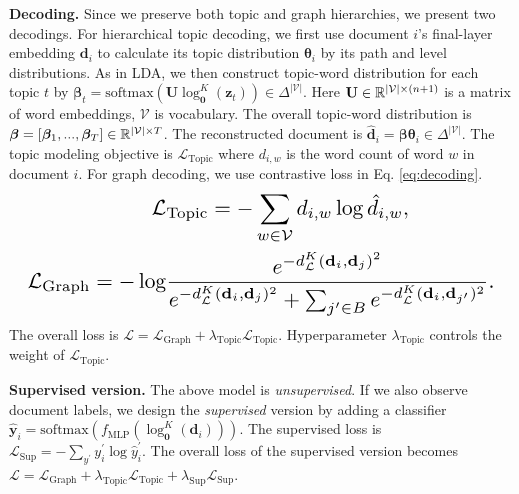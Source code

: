 \textbf{Decoding.} Since we preserve both topic and graph hierarchies, we present two decodings. For hierarchical topic decoding, we first use document $ i $'s final-layer embedding $ \textbf{d}_i $ to calculate its topic distribution $ \bm{\theta}_i $ by its path and level distributions. As in LDA, we then construct topic-word distribution for each topic $ t $ by %
$ \bm{\beta}_t=\text{softmax}(\textbf{U}\log_{\textbf{0}}^K(\textbf{z}_t))\in\Delta^{|\mathcal{V}|} $. Here $ \textbf{U}\in\Bbb R^{|\mathcal{V}|\times(n+1)} $ is a matrix of word embeddings, $ \mathcal{V} $ is vocabulary. %
The overall topic-word distribution is $ \bm{\beta}=[\bm{\beta}_1,...,\bm{\beta}_T]\in\Bbb R^{|\mathcal{V}|\times T} $. The reconstructed document is $ \hat{\textbf{d}}_i=\bm{\beta}\bm{\theta}_i\in\Delta^{|\mathcal{V}|} $. The topic modeling objective is $ \mathcal{L}_{\text{Topic}} $ where $ d_{i,w} $ is the word count of word $ w $ in document $ i $. For graph decoding, we use contrastive loss in Eq. \ref{eq:decoding}. %
\begin{equation}
\label{eq:decoding}
\resizebox{1\columnwidth}{!}{
$ \begin{split}
    \mathcal{L}&_{\text{Topic}}=-\sum_{w\in\mathcal{V}}d_{i,w}\log \hat{d}_{i,w},\\
    \mathcal{L}_{\text{Graph}}=-\log& \dfrac{e^{-d_{\mathcal{L}}^K(\textbf{d}_i,\textbf{d}_j)^2}}{e^{-d_{\mathcal{L}}^K(\textbf{d}_i,\textbf{d}_j)^2}+\sum_{j^\prime\in B}e^{-d_{\mathcal{L}}^K(\textbf{d}_i,\textbf{d}_{j^\prime})^2}}.
\end{split} $
}
\end{equation}
The overall loss is $ \mathcal{L}=\mathcal{L}_{\text{Graph}}+\lambda_{\text{Topic}}\mathcal{L}_{\text{Topic}} $. Hyperparameter $ \lambda_{\text{Topic}} $ controls the weight of $ \mathcal{L}_{\text{Topic}} $.

\textbf{Supervised version.} The above model is \emph{unsupervised}. If we also observe document labels, %
we design the \emph{supervised} version by adding a classifier $ \hat{\textbf{y}}_i= \text{softmax}(f_{\text{MLP}}(\log_{\textbf{0}}^K(\textbf{d}_i))) $. The supervised loss is $ \mathcal{L}_{\text{Sup}}=-\sum_{y^\prime}y_{i}^\prime\log\hat{y}_{i}^\prime $. The overall loss of the supervised version becomes $ \mathcal{L}=\mathcal{L}_{\text{Graph}}+\lambda_{\text{Topic}}\mathcal{L}_{\text{Topic}}+\lambda_{\text{Sup}}\mathcal{L}_{\text{Sup}} $.

